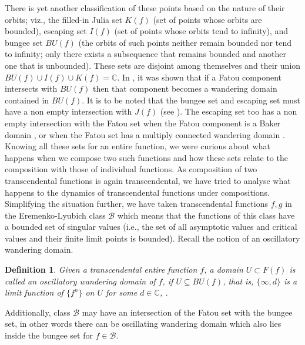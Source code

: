 \documentclass[a4paper,12pt]{amsart}
\numberwithin{equation}{section}
\newtheorem{definition}[theorem]{Definition}
\begin{document}
There is yet another classification of these points based on the nature of their orbits; viz.,  the filled-in  Julia set $K(f)$ (set of points whose orbits are bounded), escaping set $I(f)$ (set of points whose orbits tend to infinity), and bungee set $BU(f)$ (the orbits of such points neither remain bounded nor tend to infinity; only there exists a subsequence that remains bounded and another one that is unbounded). These sets  are disjoint among themselves and their union $BU(f)\cup I(f) \cup K(f)=\mathbb{C}$.  In \cite{osb2}, it was shown that if a Fatou component intersects with $BU(f)$ then that component becomes a wandering domain contained in $BU(f)$. 
It is to be noted that the bungee set and escaping set must have a non empty intersection with $J(f)$ (see \cite{e1, osb2}). The escaping set too has a non empty intersection with the Fatou set when the Fatou component is a Baker domain \cite{d1}, or when the Fatou set has a multiply connected wandering domain \cite{rs1}. Knowing all these sets for an entire function, we were curious about what happens when we compose two such functions and how these sets relate to the composition with those of individual functions. 
As composition of two  transcendental functions is again transcendental, we have tried to analyse what happens to the dynamics of transcendental functions under compositions.
\\ 
Simplifying the situation further, we have taken transcendental functions $f ,g$  in the Eremenko-Lyubich class $\mathcal{B}$ which means that the functions of this class have a bounded set of singular values (i.e., the set of all  asymptotic values and critical values and their finite limit points is bounded). Recall the notion of an oscillatory wandering domain.
\begin{definition}
 Given a transcendental entire function $f$, a domain $U\subset F(f)$ is called an oscillatory wandering domain of $f$, if  $U\subseteq BU(f)$, that is, $\{\infty, d\}$ is a limit function of $\{f^n\}$ on $U$ for some $d\in \mathbb{C}$, \cite{marti2020wandering}.
\end{definition}
 Additionally, class $\mathcal{B}$ may have an intersection of the Fatou set with the bungee set, in other words there can be oscillating wandering domain which also lies inside the bungee set for $f\in\mathcal{B}.$ 
\end{document}
